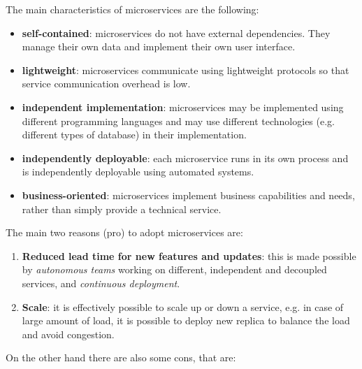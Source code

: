 The main characteristics of microservices are the following:
\begin{itemize}
   \item \textbf{self-contained}: microservices do not have external dependencies. They manage their own data and implement their own user interface.
   \item \textbf{lightweight}: microservices communicate using lightweight protocols so that service communication overhead is low.
   \item \textbf{independent implementation}: microservices may be implemented using different programming languages and may use different technologies (e.g. different types of database) in their implementation.
   \item \textbf{independently deployable}: each microservice runs in its own process and is independently deployable using automated systems.
   \item \textbf{business-oriented}: microservices implement business capabilities and needs, rather than simply provide a technical service.
\end{itemize}
The main two reasons (pro) to adopt microservices are:
\begin{enumerate}
   \item \textbf{Reduced lead time for new features and updates}: this is made possible by \textit{autonomous teams} working on different, independent and decoupled services, and \textit{continuous deployment}.
   \item \textbf{Scale}: it is effectively possible to scale up or down a service, e.g. in case of large amount of load, it is possible to deploy new replica to balance the load and avoid congestion.
\end{enumerate}
On the other hand there are also some cons, that are:
